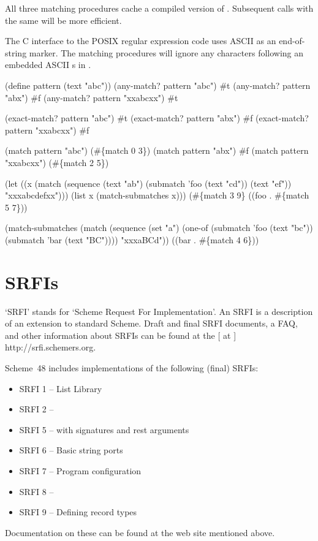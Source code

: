All three matching procedures cache a compiled version of .
Subsequent calls with the same  will be more efficient.

The C interface to the POSIX regular expression code uses ASCII 
 as an end-of-string marker.
The matching procedures will ignore any characters following an
 embedded ASCII s in .

\begin{example}
(define pattern (text "abc"))
(any-match? pattern "abc")         \evalsto #t
(any-match? pattern "abx")         \evalsto #f
(any-match? pattern "xxabcxx")     \evalsto #t

(exact-match? pattern "abc")       \evalsto #t
(exact-match? pattern "abx")       \evalsto #f
(exact-match? pattern "xxabcxx")   \evalsto #f

(match pattern "abc")              \evalsto (#\{match 0 3\})
(match pattern "abx")              \evalsto #f
(match pattern "xxabcxx")          \evalsto (#\{match 2 5\})

(let ((x (match (sequence (text "ab")
                          (submatch 'foo (text "cd"))
                          (text "ef"))
                "xxxabcdefxx")))
  (list x (match-submatches x)))
  \evalsto (#\{match 3 9\} ((foo . #\{match 5 7\}))

(match-submatches
  (match (sequence
           (set "a")
           (one-of (submatch 'foo (text "bc"))
                   (submatch 'bar (text "BC"))))
         "xxxaBCd"))
  \evalsto ((bar . #\{match 4 6\}))
\end{example}

\section{SRFIs}

`SRFI' stands for `Scheme Request For Implementation'.
An SRFI is a description of an extension to standard Scheme.
Draft and final SRFI documents, a FAQ, and other information about SRFIs
 can be found at the
[ at ]
{http://srfi.schemers.org}.

Scheme~48 includes implementations of the following (final) SRFIs:
\begin{itemize}
\item SRFI 1 -- List Library
\item SRFI 2 -- 
\item SRFI 5 --  with signatures and rest arguments
\item SRFI 6 -- Basic string ports
\item SRFI 7 -- Program configuration
\item SRFI 8 -- 
\item SRFI 9 -- Defining record types
\end{itemize}
Documentation on these can be found at the web site mentioned above.

